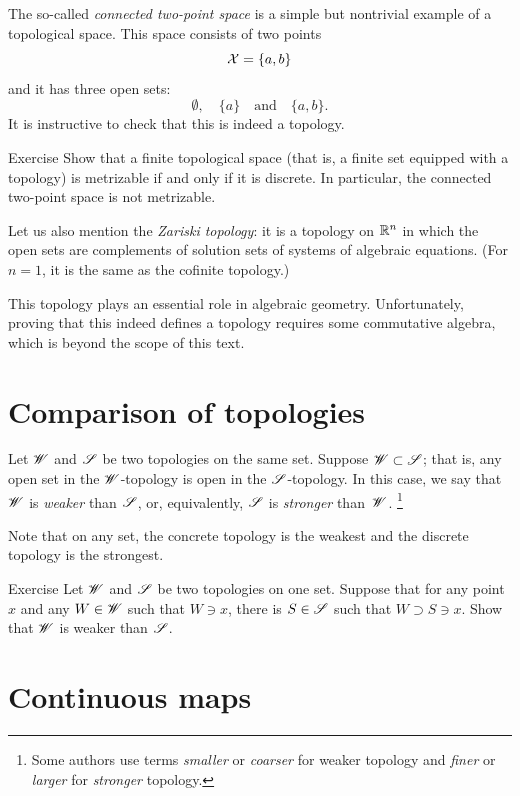 The so-called \emph{connected two-point space} is a simple but nontrivial example of a topological space.
This space consists of two points
\[\mathcal{X}=\{a,b\}\]
and it has three open sets:
\[\emptyset,\quad \{a\}\quad\text{and}\quad\{a,b\}.\]
It is instructive to check that this is indeed a topology.

\begin{thm}{Exercise}\label{ex:finite+metrizable}
Show that a finite topological space (that is, a finite set equipped with a topology) is metrizable if and only if it is discrete.
In particular, the connected two-point space is not metrizable.
\end{thm}

Let us also mention the \emph{Zariski topology}: it is a topology on $\mathbb{R}^n$ in which the open sets are complements of solution sets of systems of algebraic equations.
(For $n=1$, it is the same as the cofinite topology.)

This topology plays an essential role in algebraic geometry.
Unfortunately, proving that this indeed defines a topology requires some commutative algebra, which is beyond the scope of this text.

\section{Comparison of topologies}

Let $\mathscr{W}$ and $\mathscr{S}$ be two topologies on the same set.
Suppose $\mathscr{W}\subset\mathscr{S}$; that is, any open set in the $\mathscr{W}$-topology is open in the $\mathscr{S}$-topology.
In this case, we say that $\mathscr{W}$ is \emph{weaker} than $\mathscr{S}$, or, equivalently, $\mathscr{S}$ is \emph{stronger} than~$\mathscr{W}$.%
\footnote{Some authors use terms {}\emph{smaller} or {}\emph{coarser} for weaker topology and  {}\emph{finer} or  {}\emph{larger} for {}\emph{stronger} topology.}

Note that on any set, the concrete topology is the weakest and the discrete topology is the strongest.

\begin{thm}{Exercise}\label{ex:weaker-top}
Let $\mathscr{W}$ and $\mathscr{S}$ be two topologies on one set.
Suppose that for any point $x$ and any $W\in\mathscr{W}$ such that $W\ni x$, there is $S\in \mathscr{S}$ such that 
$W\supset S\ni x$.
Show that $\mathscr{W}$ is weaker than $\mathscr{S}$.
\end{thm}

\section{Continuous maps}\label{sec:continuous-maps}

